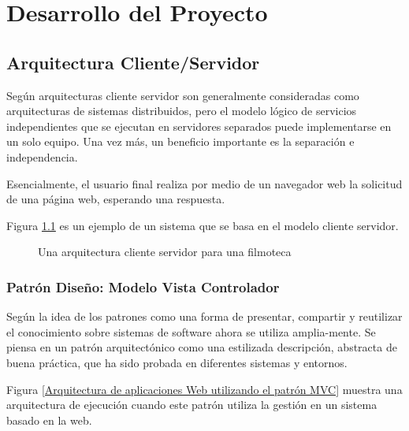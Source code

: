 \chapter{Desarrollo del Proyecto}

\section{Arquitectura Cliente/Servidor}

Según \cite{sommerville2011software} arquitecturas cliente servidor son
generalmente consideradas como arquitecturas de sistemas distribuidos, pero
el modelo lógico de servicios independientes que se ejecutan en servidores
separados puede implementarse en un solo equipo. Una vez más, un beneficio
importante es la separación e independencia.

Esencialmente, el usuario final realiza por medio de un navegador web la
solicitud de una página web, esperando una respuesta.

Figura \ref{Una arquitectura cliente servidor para una filmoteca} es un ejemplo de
un sistema que se basa en el modelo cliente servidor. \cite{sommerville2011software}

\begin{figure}[!htb]
	\centering
	\caption{Una arquitectura cliente servidor para una filmoteca}
	\label{Una arquitectura cliente servidor para una filmoteca}
\end{figure}

\subsection{Patrón Diseño: Modelo Vista Controlador}

Según \cite{sommerville2011software} la idea de los patrones como una forma
de presentar, compartir y reutilizar el conocimiento sobre sistemas de
software ahora se utiliza amplia-mente. Se piensa en un patrón
arquitectónico como una estilizada descripción, abstracta de buena práctica,
que ha sido probada en diferentes sistemas y entornos.

Figura \ref{Arquitectura de aplicaciones Web utilizando el patrón MVC} muestra
una arquitectura de ejecución cuando este patrón utiliza la gestión en un
sistema basado en la web. \cite{sommerville2011software}

\begin{minipage}{1.0\textwidth}
	\centering
	\label{Arquitectura de aplicaciones Web utilizando el patrón MVC}
\end{minipage}

